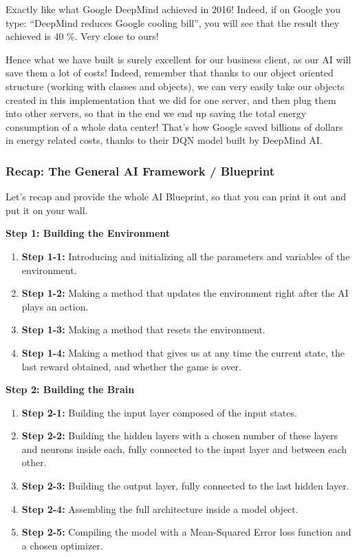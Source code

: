\documentclass[]{book}
\begin{document}
Exactly like what Google DeepMind achieved in 2016! Indeed, if on Google you type: ``DeepMind reduces Google cooling bill'', you will see that the result they achieved is 40 \%. Very close to ours!

Hence what we have built is surely excellent for our business client, as our AI will save them a lot of costs! Indeed, remember that thanks to our object oriented structure (working with classes and objects), we can very easily take our objects created in this implementation that we did for one server, and then plug them into other servers, so that in the end we end up saving the total energy consumption of a whole data center! That's how Google saved billions of dollars in energy related costs, thanks to their DQN model built by DeepMind AI.

\newpage

\subsubsection{Recap: The General AI Framework / Blueprint}

Let's recap and provide the whole AI Blueprint, so that you can print it out and put it on your wall.

\textbf{Step 1: Building the Environment}

\begin{enumerate}
    \item \textbf{Step 1-1:} Introducing and initializing all the parameters and variables of the environment.
    \item \textbf{Step 1-2:} Making a method that updates the environment right after the AI plays an action.
    \item \textbf{Step 1-3:} Making a method that resets the environment.
    \item \textbf{Step 1-4:} Making a method that gives us at any time the current state, the last reward obtained, and whether the game is over.
\end{enumerate}

\textbf{Step 2: Building the Brain}

\begin{enumerate}
    \item \textbf{Step 2-1:} Building the input layer composed of the input states.
    \item \textbf{Step 2-2:} Building the hidden layers with a chosen number of these layers and neurons inside each, fully connected to the input layer and between each other.
    \item \textbf{Step 2-3:} Building the output layer, fully connected to the last hidden layer.
    \item \textbf{Step 2-4:} Assembling the full architecture inside a model object.
    \item \textbf{Step 2-5:} Compiling the model with a Mean-Squared Error loss function and a chosen optimizer.
\end{enumerate}
\end{document}
